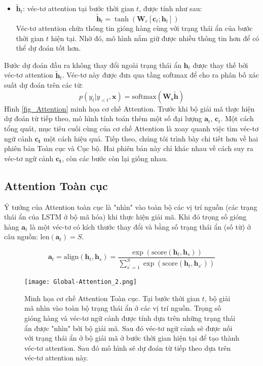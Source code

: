 \begin{itemize}
	\item $\bm{\tilde{h}}_t$: véc-tơ attention tại bước thời gian $t$, được tính như sau:
	\begin{equation}
	\boldsymbol{\tilde{h}}_t = \tanh(\bm{W}_c[\bm{c}_t;\bm{h}_t])
	\end{equation}
	Véc-tơ attention chứa thông tin gióng hàng cùng với trạng thái ẩn của bước thời gian $t$ hiện tại. Nhờ đó, mô hình nắm giữ được nhiều thông tin hơn để có thể dự đoán tốt hơn.
\end{itemize}
Bước dự đoán đầu ra không thay đổi ngoài trạng thái ẩn $\bm{h}_t$ được thay thế bởi véc-tơ attention $\bm{\tilde{h}}_t$. Véc-tơ này được đưa qua tầng softmax để cho ra phân bố xác suất dự đoán trên các từ:
\begin{equation}
p(y_t | y_{<t}, \bm{x}) = \text{softmax}(\bm{W_s\tilde{h}})
\end{equation}
Hình \ref{fig_Attention} minh họa cơ chế Attention. Trước khi bộ giải mã thực hiện dự đoán từ tiếp theo, mô hình tính toán thêm một số đại lượng $\bm{a}_t$, $\bm{c}_t$. Một cách tổng quát, mục tiêu cuối cùng của cơ chế Attention là xoay quanh việc tìm véc-tơ ngữ cảnh $\bm{c_t}$ một cách hiệu quả.
Tiếp theo, chúng tôi trình bày chi tiết hơn về hai phiên bản Toàn cục và Cục bộ. Hai phiên bản này chỉ khác nhau về cách suy ra véc-tơ ngữ cảnh $\bm{c_t}$, còn các bước còn lại giống nhau.
\subsection{Attention Toàn cục}
Ý tưởng của Attention toàn cục là "nhìn" vào toàn bộ các vị trí nguồn (các trạng thái ẩn của LSTM ở bộ mã hóa) khi thực hiện giải mã.
Khi đó trọng số gióng hàng $\bm{a}_t$ là một véc-tơ có kích thước thay đổi và bằng số trạng thái ẩn (số từ) ở câu nguồn: $\text{len}(\bm{a}_t) = S$.

\begin{equation}
\bm{a}_t = \text{align}(\bm{h}_t, \bm{h}_s) = \frac{\exp\left(\text{score}(\bm{h}_t, \bm{h}_s)\right)}{\sum^{S}_{s^{'}=1}\exp\left(\text{score}(\bm{h}_t, \bm{h}_{s^{'}})\right)}
\end{equation}

\begin{figure}
	\centering
	\texttt{[image: Global-Attention\_2.png]}
	\caption[Minh họa cơ chế Attention Toàn cục.]{Minh họa cơ chế Attention Toàn cục. Tại bước thời gian $t$, bộ giải mã nhìn vào toàn bộ trạng thái ẩn ở các vị trí nguồn. Trọng số gióng hàng và véc-tơ ngữ cảnh được tính dựa trên những trạng thái ẩn được "nhìn" bởi bộ giải mã. Sau đó véc-tơ ngữ cảnh sẽ được nối với trạng thái ẩn ở bộ giải mã ở bước thời gian hiện tại để tạo thành véc-tơ attention. Sau đó mô hình sẽ dự đoán từ tiếp theo dựa trên véc-tơ attention này.}
	\label{fig_Global_Attention}
\end{figure}

